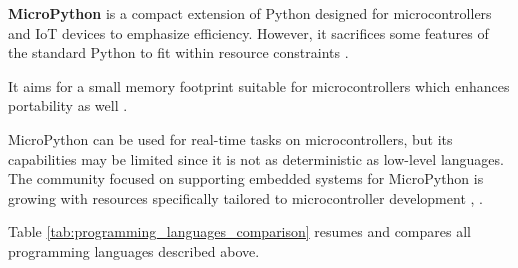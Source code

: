 \textbf{MicroPython} is a compact extension of Python designed for microcontrollers and \gls{IoT} devices to emphasize efficiency.
However, it sacrifices some features of the standard Python to fit within resource constraints \cite{LPROG2}.

It aims for a small memory footprint suitable for microcontrollers which enhances portability as well \cite{LPROG7}.

MicroPython can be used for real-time tasks on microcontrollers, but its capabilities may be limited since it is not as deterministic as low-level languages.
The community focused on supporting embedded systems for MicroPython is growing with resources specifically tailored to microcontroller development \cite{LPROG2}, \cite{LPROG5}.

Table \ref{tab:programming_languages_comparison} resumes and compares all programming languages described above.
\begin{table}[H]
    \centering
    \caption{Comparison of Programming Languages}
    \label{tab:programming_languages_comparison}
\end{table}

